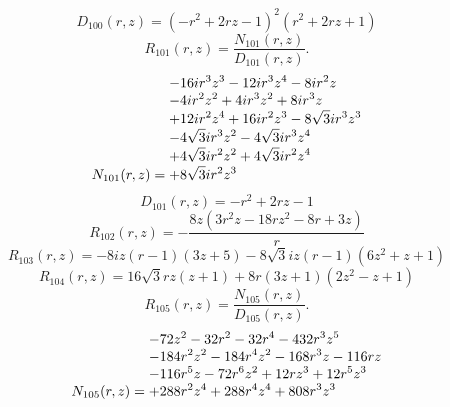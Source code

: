 \documentclass[11pt,a4paper]{article}
\begin{document}
\begin{equation}
D_{100}(r,z)=\left(- r^{2} + 2 r z - 1\right)^{2} \left(r^{2} + 2 r z + 1\right)
\label{eq:cat-denominator-100}
\end{equation}
\begin{equation}
R_{101}(r,z)=\frac{N_{101}(r,z)}{D_{101}(r,z)}.
\label{eq:cat-rational-101}
\end{equation}
\begin{equation}
N_{101}(r,z)=\shortstack[l]{$\displaystyle  - 16 i r^{3} z^{3} - 12 i r^{3} z^{4} - 8 i r^{2} z$\\
$\displaystyle  - 4 i r^{2} z^{2} + 4 i r^{3} z^{2} + 8 i r^{3} z$\\
$\displaystyle  + 12 i r^{2} z^{4} + 16 i r^{2} z^{3} - 8 \sqrt{3} i r^{3} z^{3}$\\
$\displaystyle  - 4 \sqrt{3} i r^{3} z^{2} - 4 \sqrt{3} i r^{3} z^{4}$\\
$\displaystyle  + 4 \sqrt{3} i r^{2} z^{2} + 4 \sqrt{3} i r^{2} z^{4}$\\
$\displaystyle  + 8 \sqrt{3} i r^{2} z^{3}$}
\label{eq:cat-numerator-101}
\end{equation}
\begin{equation}
D_{101}(r,z)=- r^{2} + 2 r z - 1
\label{eq:cat-denominator-101}
\end{equation}
\begin{equation}
R_{102}(r,z)=- \frac{8 z \left(3 r^{2} z - 18 r z^{2} - 8 r + 3 z\right)}{r}
\label{eq:cat-rational-102}
\end{equation}
\begin{equation}
R_{103}(r,z)=- 8 i z \left(r - 1\right) \left(3 z + 5\right) - 8 \sqrt{3} i z \left(r - 1\right) \left(6 z^{2} + z + 1\right)
\label{eq:cat-rational-103}
\end{equation}
\begin{equation}
R_{104}(r,z)=16 \sqrt{3} r z \left(z + 1\right) + 8 r \left(3 z + 1\right) \left(2 z^{2} - z + 1\right)
\label{eq:cat-rational-104}
\end{equation}
\begin{equation}
R_{105}(r,z)=\frac{N_{105}(r,z)}{D_{105}(r,z)}.
\label{eq:cat-rational-105}
\end{equation}
\begin{equation}
N_{105}(r,z)=\shortstack[l]{$\displaystyle  - 72 z^{2} - 32 r^{2} - 32 r^{4} - 432 r^{3} z^{5}$\\
$\displaystyle  - 184 r^{2} z^{2} - 184 r^{4} z^{2} - 168 r^{3} z - 116 r z$\\
$\displaystyle  - 116 r^{5} z - 72 r^{6} z^{2} + 12 r z^{3} + 12 r^{5} z^{3}$\\
$\displaystyle  + 288 r^{2} z^{4} + 288 r^{4} z^{4} + 808 r^{3} z^{3}$}
\label{eq:cat-numerator-105}
\end{equation}
\end{document}
